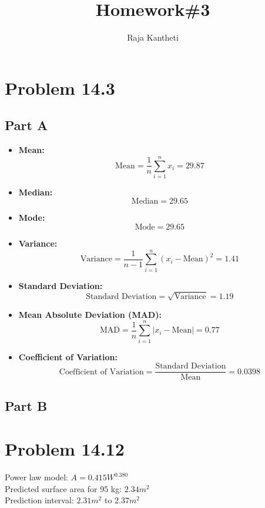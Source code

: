 \documentclass[12pt]{article}
\title{Homework\#3}
\author{Raja Kantheti}
\begin{document}
\maketitle
\section{Problem 14.3}

\subsection*{Part A}

\begin{itemize}
    \item \textbf{Mean:}
    \[
    \text{Mean} = \frac{1}{n} \sum_{i=1}^n x_i = 29.87
    \]
    
    \item \textbf{Median:}
    \[
    \text{Median} = 29.65
    \]
    
    \item \textbf{Mode:}
    \[
    \text{Mode} = 29.65
    \]
    
    \item \textbf{Variance:}
    \[
    \text{Variance} = \frac{1}{n-1} \sum_{i=1}^n \left( x_i - \text{Mean} \right)^2 = 1.41
    \]
    
    \item \textbf{Standard Deviation:}
    \[
    \text{Standard Deviation} = \sqrt{\text{Variance}} = 1.19
    \]
    
    \item \textbf{Mean Absolute Deviation (MAD):}
    \[
    \text{MAD} = \frac{1}{n} \sum_{i=1}^n |x_i - \text{Mean}| = 0.77
    \]
    
    \item \textbf{Coefficient of Variation:}
    \[
    \text{Coefficient of Variation} = \frac{\text{Standard Deviation}}{\text{Mean}} = 0.0398
    \]
\end{itemize}
\subsection*{Part B}

\section{Problem 14.12}
Power law model: $A = 0.415W^{0.380}$\\
Predicted surface area for 95 kg: $2.34 m^2$\\
Prediction interval: $2.31 m^2$ to $2.37 m^2$
\end{document}

